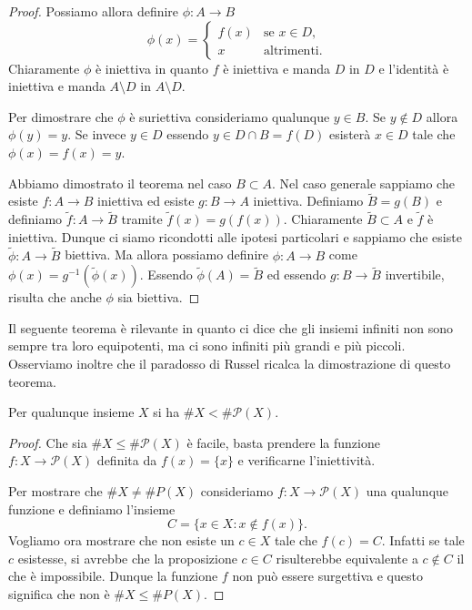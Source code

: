 \documentclass[italian,a4paper,hidelinks,headinclude]{scrartcl}
\renewcommand{\P}{{\mathcal P}}
\begin{document}
\begin{proof}
Possiamo allora definire $\phi \colon A \to B$
\[
\phi(x) =
\begin{cases}
   f(x) & \text{se $x\in D$}, \\
   x & \text{altrimenti.}
\end{cases}
\]
Chiaramente $\phi$ è iniettiva in quanto $f$ è iniettiva e manda $D$ in $D$
e l'identità è iniettiva e manda $A\setminus D$ in $A\setminus D$.

Per dimostrare che $\phi$ è suriettiva consideriamo qualunque $y \in B$.
Se $y\not \in D$ allora $\phi(y)=y$.
Se invece $y\in D$ essendo $y\in D\cap B = f(D)$ esisterà $x\in D$ tale
che $\phi(x) = f(x) = y$.

Abbiamo dimostrato il teorema nel caso $B\subset A$.
Nel caso generale sappiamo che esiste $f\colon A\to B$ iniettiva
ed esiste $g\colon B\to A$ iniettiva. Definiamo $\tilde B=g(B)$ e
definiamo $\tilde f\colon A\to \tilde B$ tramite $\tilde f(x) = g(f(x))$.
Chiaramente $\tilde B\subset A$ e $\tilde f$ è iniettiva.
Dunque ci siamo ricondotti alle ipotesi particolari e sappiamo che esiste
$\tilde \phi \colon A \to \tilde B$ biettiva. Ma allora possiamo definire
$\phi\colon A\to B$ come $\phi(x) = g^{-1}(\tilde \phi(x))$.
Essendo $\tilde \phi(A)=\tilde B$ ed essendo $g\colon B\to \tilde B$
invertibile, risulta che anche $\phi$ sia biettiva.
\end{proof}


Il seguente teorema è rilevante in quanto ci dice che gli insiemi infiniti
non sono sempre tra loro equipotenti, ma ci sono infiniti più grandi e più piccoli.
Osserviamo inoltre che il paradosso di Russel
ricalca la dimostrazione di questo teorema.

\begin{theorem}[Cantor]
Per qualunque insieme $X$ si ha $\# X < \# \P(X)$.
\end{theorem}
%
\begin{proof}
Che sia $\#X\le \#\P(X)$ è facile, basta prendere la funzione
$f\colon X\to \P(X)$ definita da $f(x) = \{x\}$ e verificarne
l'iniettività.

Per mostrare che $\# X \neq \#P(X)$ consideriamo
$f\colon X \to \P(X)$ una qualunque funzione
e definiamo l'insieme
\[
   C = \{x \in X \colon x \not \in f(x) \}.
\]
Vogliamo ora mostrare che non esiste un $c\in X$ tale che $f(c) = C$.
Infatti se tale $c$ esistesse, si avrebbe che la proposizione
$c\in C$ risulterebbe equivalente a $c\not \in C$ il che è impossibile.
Dunque la funzione $f$ non può essere surgettiva e questo significa che
non è $\#X \le \#P(X)$.
\end{proof}
\end{document}
